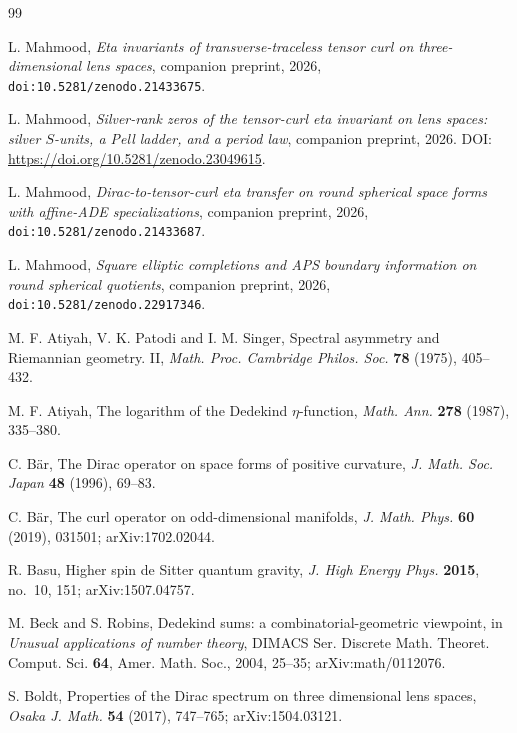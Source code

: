 \documentclass[11pt]{article}
\theoremstyle{definition}
\begin{document}

\begin{thebibliography}{99}

L. Mahmood, \emph{Eta invariants of transverse-traceless tensor curl on
three-dimensional lens spaces}, companion preprint, 2026,
\texttt{doi:10.5281/zenodo.21433675}.

L. Mahmood, \emph{Silver-rank zeros of the tensor-curl eta invariant on
lens spaces: silver $S$-units, a Pell ladder, and a period law},
companion preprint, 2026. DOI:
\url{https://doi.org/10.5281/zenodo.23049615}.

L. Mahmood, \emph{Dirac-to-tensor-curl eta transfer on round spherical
space forms with affine-ADE specializations}, companion preprint, 2026,
\texttt{doi:10.5281/zenodo.21433687}.

L. Mahmood, \emph{Square elliptic completions and APS boundary
information on round spherical quotients}, companion preprint, 2026,
\texttt{doi:10.5281/zenodo.22917346}.

M. F. Atiyah, V. K. Patodi and I. M. Singer, Spectral asymmetry and
Riemannian geometry. II, \emph{Math. Proc. Cambridge Philos. Soc.}
\textbf{78} (1975), 405--432.

M. F. Atiyah, The logarithm of the Dedekind $\eta$-function,
\emph{Math. Ann.} \textbf{278} (1987), 335--380.

C. B\"ar, The Dirac operator on space forms of positive curvature,
\emph{J. Math. Soc. Japan} \textbf{48} (1996), 69--83.

C. B\"ar, The curl operator on odd-dimensional manifolds,
\emph{J. Math. Phys.} \textbf{60} (2019), 031501; arXiv:1702.02044.

R. Basu, Higher spin de Sitter quantum gravity, \emph{J. High Energy
Phys.} \textbf{2015}, no.~10, 151; arXiv:1507.04757.

M. Beck and S. Robins, Dedekind sums: a combinatorial-geometric
viewpoint, in \emph{Unusual applications of number theory}, DIMACS Ser.
Discrete Math. Theoret. Comput. Sci. \textbf{64}, Amer. Math. Soc., 2004,
25--35; arXiv:math/0112076.

S. Boldt, Properties of the Dirac spectrum on three dimensional lens
spaces, \emph{Osaka J. Math.} \textbf{54} (2017), 747--765; arXiv:1504.03121.


\end{thebibliography}
\end{document}
